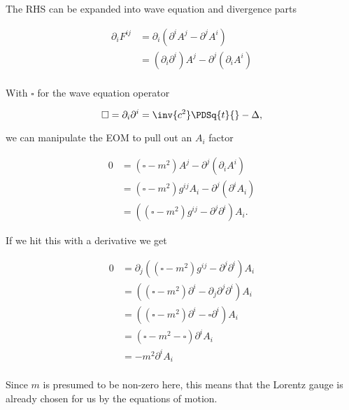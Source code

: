 The RHS can be expanded into wave equation and divergence parts

\begin{align*}
\partial_i F^{ij}
&=
\partial_i (\partial^i A^j - \partial^j A^i) \\
&=
(\partial_i \partial^i) A^j - \partial^j (\partial_i A^i) \\
\end{align*}

With $\square$ for the wave equation operator

\begin{equation}\label{eqn:relativisticElectrodynamicsL14:750}
\square = \partial_i \partial^i = \inv{c^2} \PDSq{t}{} - \Delta,
\end{equation}

we can manipulate the EOM to pull out an $A_i$ factor

\begin{align*}
0 
&= \left( \square -m^2 \right) A^j - \partial^j (\partial_i A^i) \\
&= \left( \square -m^2 \right) g^{ij} A_i - \partial^j (\partial^i A_i) \\
&= \left( \left( \square -m^2 \right) g^{ij} - \partial^j \partial^i \right) A_i.
\end{align*}

If we hit this with a derivative we get	

\begin{align*}
0 
&= \partial_j \left( \left( \square -m^2 \right) g^{ij} - \partial^j \partial^i \right) A_i \\
&= \left( \left( \square -m^2 \right) \partial^i - \partial_j \partial^j \partial^i \right) A_i \\
&= \left( \left( \square -m^2 \right) \partial^i - \square \partial^i \right) A_i \\
&= \left( \square -m^2 - \square \right) \partial^i A_i \\
&= -m^2 \partial^i A_i \\
\end{align*}

Since $m$ is presumed to be non-zero here, this means that the Lorentz gauge is already chosen for us by the equations of motion.

\EndArticle
